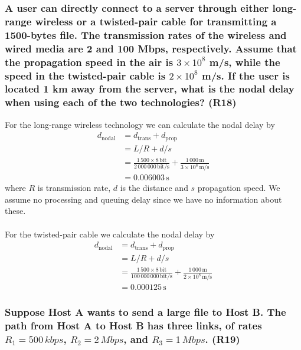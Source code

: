 \subsubsection{A user can directly connect to a server through either long-range wireless or a twisted-pair cable for transmitting a 1500-bytes file. The transmission rates of the wireless and wired media are 2 and 100 Mbps, respectively. Assume that the propagation speed in the air is $3 \times 10^8$ m/s, while the speed in the twisted-pair cable is $2 \times 10^8$ m/s. If the user is located 1 km away from the server, what is the nodal delay when using each of the two technologies? (R18)}

For the long-range wireless technology we can calculate the nodal delay by
\begin{equation*}
\begin{split}
    d_{\text{nodal}} &= d_{\text{trans}} + d_{\text{prop}} \\
    &= L/R + d/s \\
    &= \frac{1 \, 500 \times 8 \, \text{bit}}{2\, 000 \, 000 \, \text{bit/s}} + \frac{1 \, 000\, \text{m}}{3 \times 10^8 \, \text{m/s}} \\
    &= 0.006003 \, \text{s}
\end{split}
\end{equation*}
where $R$ is transmission rate, $d$ is the distance and $s$ propagation speed. We assume no processing and queuing delay since we have no information about these. \\
\\
For the twisted-pair cable we calculate the nodal delay by
\begin{equation*}
    \begin{split}
        d_{\text{nodal}} &= d_{\text{trans}} + d_{\text{prop}} \\
        &= L/R + d/s \\
        &= \frac{1 \, 500 \times 8 \, \text{bit}}{100 \, 000 \, 000 \, \text{bit/s}} + \frac{1 \, 000\, \text{m}}{2 \times 10^8 \, \text{m/s}} \\
    &= 0.000125 \, \text{s}
\end{split}
\end{equation*}



\subsubsection{Suppose Host A wants to send a large file to Host B. The path from Host A to Host B has three links, of rates $R_1 = 500 \, kbps$, $R_2 = 2 \, Mbps$, and $R_3 = 1 \, Mbps$. (R19)}

